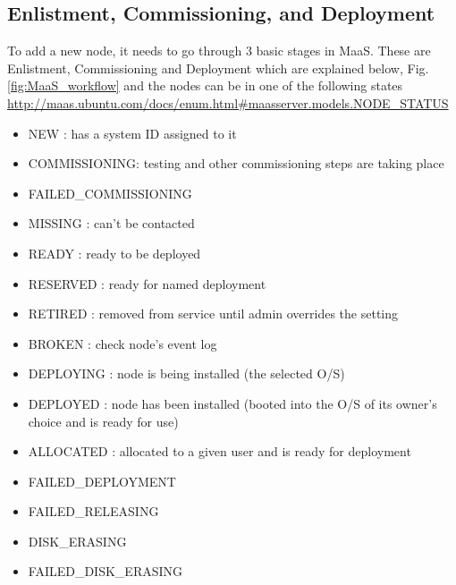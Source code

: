 
  


\subsection{Enlistment, Commissioning, and Deployment}
\label{sec:MaaS_three-stages}

To add a new node, it needs to go through 3 basic stages in MaaS. These are
Enlistment, Commissioning and Deployment which are explained below,
Fig.\ref{fig:MaaS_workflow} and the nodes can be in one of the following states
\url{http://maas.ubuntu.com/docs/enum.html\#maasserver.models.NODE_STATUS}
\begin{itemize}
  \item NEW : has a system ID assigned to it
  \item COMMISSIONING: testing and other commissioning steps are taking place
  \item FAILED\_COMMISSIONING
  \item MISSING : can't be contacted
  \item READY : ready to be deployed
  \item RESERVED : ready for named deployment
  
  \item RETIRED : removed from service until admin overrides the setting
  \item BROKEN : check node's event log
  \item DEPLOYING : node is being installed (the selected O/S)
  \item DEPLOYED : node has been installed (booted into the O/S of its owner's
  choice and is ready for use)
  \item ALLOCATED : allocated to a given user and is ready for deployment
  \item FAILED\_DEPLOYMENT
  \item FAILED\_RELEASING
  \item DISK\_ERASING
  \item FAILED\_DISK\_ERASING 
\end{itemize}



